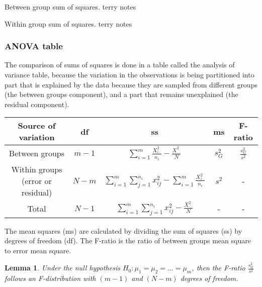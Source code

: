 \documentclass[12pt]{article}
\theoremstyle{break}
\newtheorem{lemma}[theorem]{Lemma}
\begin{document}
\begin{mdframed}
Between group sum of squares.
\textcolor[rgb]{1.00,1.00,1.00}{terry notes\lipsum[1-6]}
\end{mdframed}

\begin{mdframed}
Within group sum of squares.
\textcolor[rgb]{1.00,1.00,1.00}{terry notes\lipsum[1-6]}
\end{mdframed}

\subsubsection{ANOVA table}
The comparison of sums of squares is done in a table called the analysis of variance table, because the variation in the observations is being partitioned into part that is explained by the data because they are sampled from different groups (the between groups component), and a part that remains unexplained (the residual component).

\begin{center}
\begin{tabular}{|c|c|c|c|c|}
  \hline
  Source of variation & df & ss & ms & F-ratio \\ [20pt]\hline
  Between groups & $m-1$ & $\displaystyle \sum_{i=1}^{m}\frac{X_{i\cdot}^{2}}{n_{i}}-\frac{X_{\cdot\cdot}^{2}}{N}$ & $s_{G}^{2}$ & $\displaystyle \frac{s_{G}^{2}}{s^{2}}$ \\[20pt] \hline
  Within groups (error or residual) & $N-m$ & $\displaystyle  \sum_{i=1}^{m}\sum_{j=1}^{n_{i}}x_{ij}^{2}-\sum_{i=1}^{m}\frac{X_{i\cdot}^{2}}{n_{i}}$ & $s^{2}$ & - \\[20pt] \hline
  Total & $N-1$ & $\displaystyle \sum_{i=1}^{m}\sum_{j=1}^{n_{i}}x_{ij}^{2}-\frac{X_{\cdot\cdot}^2}{N}$ & - & - \\[20pt]
  \hline
\end{tabular}
\end{center}


The mean squares (ms) are calculated by dividing the sum of squares (ss) by degrees of freedom (df). The F-ratio is the ratio of between groups mean square to error mean square.

\begin{lemma}
Under the null hypothesis $H_{0}: \mu_{1}=\mu_{2}=\ldots=\mu_{m}$, then the F-ratio $\displaystyle \frac{s_{G}^{2}}{s^{2}}$ follows an F-distribution with $(m - 1)$ and $(N - m)$ degrees of freedom.
\end{lemma}
\end{document}
